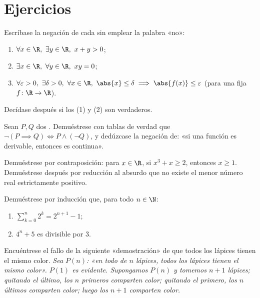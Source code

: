 \section{Ejercicios}

\begin{exercise}[$\star$]\label{exo:b1:logic:1}
Escríbase la negación de cada  sin emplear la palabra «no»:
\begin{enumerate}
  \item $\forall x \in \R,\ \exists y \in \R,\ x + y > 0$;
  \item $\exists x \in \R,\ \forall y \in \R,\ xy = 0$;
  \item $\forall \varepsilon > 0,\ \exists \delta > 0,\ \forall x \in
        \R,\ \abs{x} \leq \delta \implies \abs{f(x)} \leq \varepsilon$
        (para una  fija $f \colon \R \to \R$).
\end{enumerate}
Decídase después si los  (1) y (2) son verdaderos.
\end{exercise}

\begin{exercise}[$\star$]\label{exo:b1:logic:2}
Sean $P, Q$ dos . Demuéstrese con tablas de verdad que
$\lnot(P \implies Q) \iff P \land (\lnot Q)$, y dedúzcase la negación
de: «si una función es derivable, entonces es continua».
\end{exercise}

\begin{exercise}[$\star$]\label{exo:b1:logic:3}
Demuéstrese por contraposición: para $x \in \R$, si $x^3 + x \geq 2$,
entonces $x \geq 1$. Demuéstrese después por reducción al absurdo que no
existe el menor número real estrictamente positivo.
\end{exercise}

\begin{exercise}[$\star$]\label{exo:b1:logic:4}
Demuéstrese por inducción que, para todo $n \in \N$:
\begin{enumerate}
  \item $\sum_{k=0}^{n} 2^k = 2^{n+1} - 1$;
  \item $4^n + 5$ es divisible por $3$.
\end{enumerate}
\end{exercise}

\begin{exercise}[$\star$]\label{exo:b1:logic:5}
Encuéntrese el fallo de la siguiente «demostración» de que todos los
lápices tienen el mismo color. \emph{Sea $P(n)$: «en todo  de
$n$ lápices, todos los lápices tienen el mismo color». $P(1)$ es
evidente. Supongamos $P(n)$ y tomemos $n+1$ lápices; quitando el último,
los $n$ primeros comparten color; quitando el primero, los $n$ últimos
comparten color; luego los $n+1$ comparten color.}
\end{exercise}

